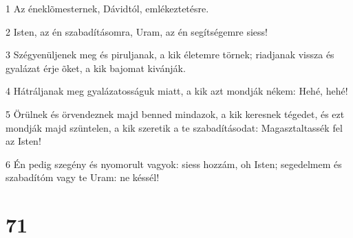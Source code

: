 \par 1 Az éneklõmesternek, Dávidtól, emlékeztetésre.
\par 2 Isten, az én szabadításomra, Uram, az én segítségemre siess!
\par 3 Szégyenüljenek meg és piruljanak, a kik életemre törnek; riadjanak vissza és gyalázat érje õket, a kik bajomat kivánják.
\par 4 Hátráljanak meg gyalázatosságuk miatt, a kik azt mondják nékem: Hehé, hehé!
\par 5 Örülnek és örvendeznek majd benned mindazok, a kik keresnek tégedet, és ezt mondják majd szüntelen, a kik szeretik a te szabadításodat: Magasztaltassék fel az Isten!
\par 6 Én pedig szegény és nyomorult vagyok: siess hozzám, oh Isten; segedelmem és szabadítóm vagy te Uram: ne késsél!

\chapter{71}

